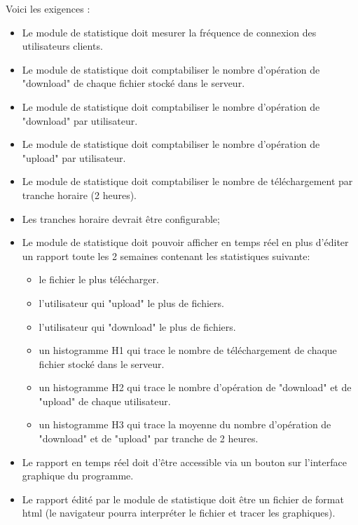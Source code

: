 \documentclass[10pt,a4paper]{report}
\begin{document}
Voici les exigences :

\begin{itemize}[label = $\triangleright$]
\item Le module de statistique doit mesurer la fréquence de connexion des utilisateurs clients.

\item Le module de statistique doit comptabiliser le nombre d'opération de "download" de chaque fichier stocké dans le serveur.

\item Le module de statistique doit comptabiliser le nombre d'opération de "download" par utilisateur.

\item Le module de statistique doit comptabiliser le nombre d'opération de "upload" par utilisateur.

\item Le module de statistique doit comptabiliser le nombre de téléchargement par tranche horaire (2 heures).

\item Les tranches horaire devrait être configurable;

\item Le module de statistique doit pouvoir afficher en temps réel en plus d'éditer un rapport toute les 2 semaines contenant les statistiques suivante:

\begin{itemize}
\item le fichier le plus télécharger.

\item l'utilisateur qui "upload" le plus de fichiers.

\item l'utilisateur qui "download" le plus de fichiers.

\item un histogramme H1 qui trace le nombre de téléchargement de chaque fichier stocké dans le serveur.

\item un histogramme H2 qui trace le nombre d'opération de "download" et de "upload" de chaque utilisateur.

\item un histogramme H3 qui trace la moyenne du nombre d'opération de "download" et de "upload" par tranche de 2 heures.
\end{itemize}

\item Le rapport en temps réel doit d'être accessible via un bouton sur l'interface graphique du programme.

\item Le rapport édité par le module de statistique doit être un fichier de format html (le navigateur pourra interpréter le fichier et tracer les graphiques).
\end{itemize}
\end{document}
